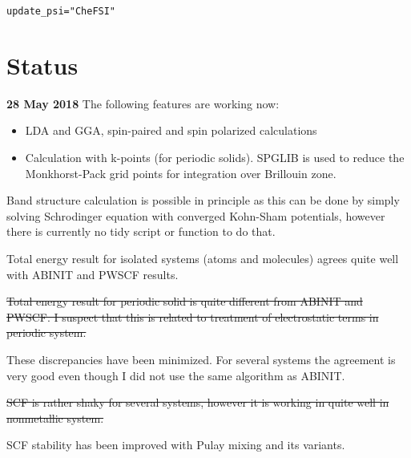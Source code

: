 \documentclass[a4paper,10pt,twocolumn]{paper}
\newcommand{\jlcode}[1]{\texttt{#1}}
\begin{document}
\jlcode{update_psi="CheFSI"}


\section{Status}

\textbf{28 May 2018} The following features are working now:
\begin{itemize}
\item LDA and GGA, spin-paired and spin polarized calculations
\item Calculation with k-points (for periodic solids).
  \textsf{SPGLIB} is used to reduce the Monkhorst-Pack grid points
  for integration over Brillouin zone.
\end{itemize}

Band structure calculation is possible in principle as this can be
done by simply solving
Schrodinger equation with converged Kohn-Sham potentials, however there
is currently no tidy script or function to do that.

Total energy result for isolated systems (atoms and molecules) agrees quite
well with ABINIT and PWSCF results.

\sout{Total energy result for periodic solid is quite different from ABINIT and PWSCF.
I suspect that this is related to treatment of electrostatic terms in periodic system.}

These discrepancies have been minimized. For several systems the agreement is very good
even though I did not use the same algorithm as ABINIT.

\sout{SCF is rather shaky for several systems, however it is working in quite well in nonmetallic
system.}

SCF stability has been improved with Pulay mixing and its variants.
\end{document}
